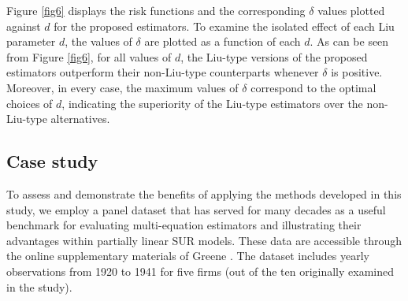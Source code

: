 \documentclass{article}
\begin{document}
Figure \ref{fig6} displays the risk functions and the corresponding $\delta$ values plotted against $d$ for the proposed estimators. To examine the isolated effect of each Liu parameter $d$, the values of $\delta$ are plotted as a function of each $d$. As can be seen from Figure \ref{fig6}, for all values of $d$, the Liu-type versions of the proposed estimators outperform their non-Liu-type counterparts whenever $\delta$ is positive. Moreover, in every case, the maximum values of $\delta$ correspond to the optimal choices of $d$, indicating the superiority of the Liu-type estimators over the non-Liu-type alternatives.



\subsection{Case study}

To assess and demonstrate the benefits of applying the methods developed in this study, we employ a panel dataset that has served for many decades as a useful benchmark for evaluating multi-equation estimators and illustrating their advantages within partially linear SUR models. These data are accessible through the online supplementary materials of Greene \cite{Green2003}. The dataset includes yearly observations from 1920 to 1941 for five firms (out of the ten originally examined in the study).
\end{document}
